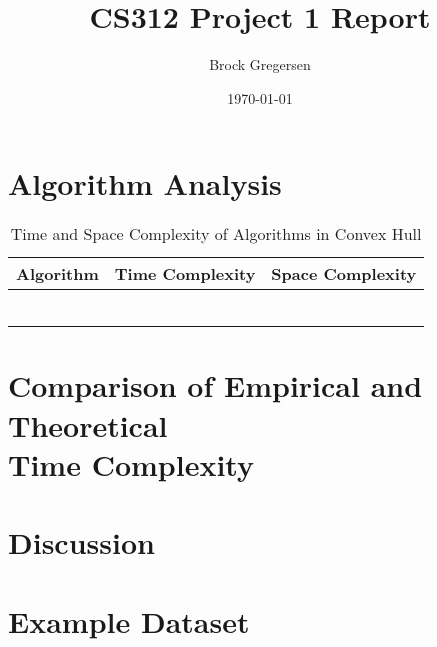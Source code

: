 \documentclass[12pt]{article}
\title{CS312 Project 1 Report}
\author{Brock Gregersen}
\date{\today}
\begin{document}
\maketitle

\section{Algorithm Analysis}

\begin{table}[h!]
\centering
\begin{threeparttable}
\begin{tabular}{@{}lcc@{}}
\toprule
\textbf{Algorithm}                  & \textbf{Time Complexity}   & \textbf{Space Complexity} \\ \midrule
                                    &                            &                           \\
                                    &                            &                           \\
                                    &                            &                           \\
                                    &                            &                           \\
                                    &                            &                           \\
                                    &                            &                           \\ \bottomrule
\end{tabular}
\end{threeparttable}
\caption{Time and Space Complexity of Algorithms in Convex Hull}
\label{tab:complexities}
\end{table}

\section[Comparison of Empirical and Theoretical Time Complexity]{Comparison of Empirical and Theoretical \\ Time Complexity}

\section{Discussion}

\section{Example Dataset}
\end{document}
